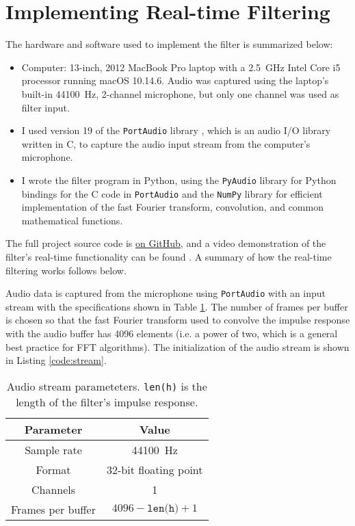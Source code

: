 \clearpage
\restoregeometry

\section{Implementing Real-time Filtering}
The hardware and software used to implement the filter is summarized below:
\begin{itemize}

    \item Computer: 13-inch, 2012 MacBook Pro laptop with a \SI{2.5}{\giga \hertz} Intel Core i5 processor running macOS 10.14.6.
    Audio was captured using the laptop's built-in \SI{44100}{\hertz}, 2-channel microphone, but only one channel was used as filter input.

    \item I used version 19 of the \texttt{PortAudio} library \cite{portaudio}, which is an audio I/O library written in C, to capture the audio input stream from the computer's microphone.

    \item I wrote the filter program in Python, using the \texttt{PyAudio} library \cite{pyaudio} for Python bindings for the C code in \texttt{PortAudio}
    and the \texttt{NumPy} library \cite{numpy} for efficient implementation of the fast Fourier transform, convolution, and common mathematical functions.

\end{itemize}
The full project source code is \href{https://github.com/ejmastnak/hilbert-bandpass}{on GitHub}, and a video demonstration of the filter's real-time functionality can be found . 
A summary of how the real-time filtering works follows below.

Audio data is captured from the microphone using \texttt{PortAudio} with an input stream with the specifications shown in Table \ref{tab:stream}.
The number of frames per buffer is chosen so that the fast Fourier transform used to convolve the impulse response with the audio buffer has 4096 elements (i.e. a power of two, which is a general best practice for FFT algorithms).
The initialization of the audio stream is shown in Listing \ref{code:stream}.

\begin{table}[htb!]
    \centering
    \begin{tabular}{|c|c|}
        \hline
        Parameter & Value\\
        \hline
        \hline
        Sample rate & \SI{44100}{\hertz}\\
        Format & 32-bit floating point\\
        Channels & 1\\
        Frames per buffer & $ 4096 - \texttt{len(h)} + 1 $\\
        \hline
    \end{tabular}
    \caption{Audio stream parameteters.
    \texttt{len(h)} is the length of the filter's impulse response.}
    \label{tab:stream}
\end{table}

